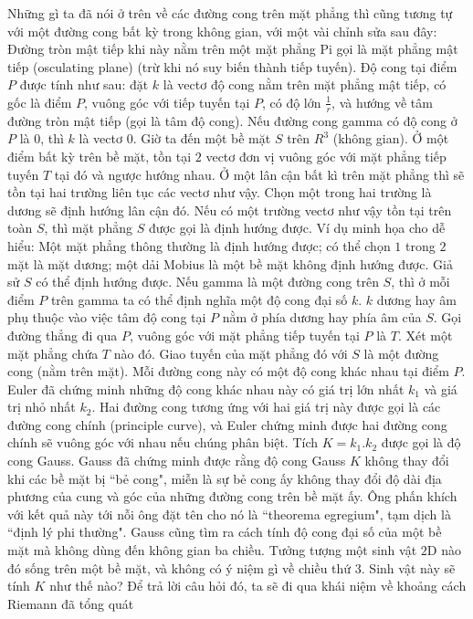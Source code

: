 \begin{multicols}{2}
	\vskip 0.1cm
	Những gì ta đã nói ở trên về các đường cong trên mặt phẳng thì cũng tương tự với một đường cong bất kỳ trong không gian, với một vài chỉnh sửa sau đây:
	\vskip 0.1cm
	Đường tròn mật tiếp khi này nằm trên một mặt phẳng Pi gọi là mặt phẳng mật tiếp (osculating plane) (trừ khi nó suy biến thành tiếp tuyến). Độ cong tại điểm $P$ được tính như sau: đặt $k$ là vectơ độ cong nằm trên mặt phẳng mật tiếp, có gốc là điểm $P$, vuông góc với tiếp tuyến tại $P$, có độ lớn $ \frac{1}{r}$, và hướng về tâm đường tròn mật tiếp (gọi là tâm độ cong). Nếu đường cong gamma có độ cong ở $P$ là $0$, thì $k$ là vectơ $0$. 
	\vskip 0.1cm
	Giờ ta đến một bề mặt $S$ trên $R^3$ (không gian). Ở một điểm bất kỳ trên bề mặt, tồn tại $2$ vectơ đơn vị vuông góc với mặt phẳng tiếp tuyến $T$ tại đó và ngược hướng nhau. Ở một lân cận bất kì trên mặt phẳng thì sẽ tồn tại hai trường liên tục các vectơ như vậy. Chọn một trong hai trường là dương sẽ định hướng lân cận đó. Nếu có một trường vectơ như vậy tồn tại trên toàn $S$, thì mặt phẳng $S$ được gọi là định hướng được. 
	\vskip 0.1cm
	Ví dụ minh họa cho dễ hiểu: Một mặt phẳng thông thường là định hướng được; có thể chọn $1$ trong $2$ mặt là mặt dương; một dải Mobius là một bề mặt không định hướng được.
	\vskip 0.1cm
	Giả sử $S$ có thể định hướng được. Nếu gamma là một đường cong trên $S$, thì ở mỗi điểm $P$ trên gamma ta có thể định nghĩa một độ cong đại số $k$. $k$ dương hay âm phụ thuộc vào việc tâm độ cong tại $P$ nằm ở phía dương hay phía âm của $S$.
	\vskip 0.1cm
	Gọi đường thẳng đi qua $P$, vuông góc với mặt phẳng tiếp tuyến tại $P$ là $T$. Xét một mặt phẳng chứa $T$ nào đó. Giao tuyến của mặt phẳng đó với $S$ là một đường cong (nằm trên mặt). Mỗi đường cong này có một độ cong khác nhau tại điểm $P$. Euler đã chứng minh những độ cong khác nhau này có giá trị lớn nhất $k_1$ và giá trị nhỏ nhất $k_2$. Hai đường cong tương ứng với hai giá trị này được gọi là các đường cong chính (principle curve), và Euler chứng minh được hai đường cong chính sẽ vuông góc với nhau nếu chúng phân biệt. Tích $K = k_1.k_2$ được gọi là độ cong Gauss. 
	\vskip 0.1cm
	Gauss đã chứng minh được rằng độ cong Gauss $K$ không thay đổi khi các bề mặt bị ``bẻ cong", miễn là sự bẻ cong ấy không thay đổi độ dài địa phương của cung và góc của những đường cong trên bề mặt ấy. 
	\vskip 0.1cm
	Ông phấn khích với kết quả này tới nỗi ông đặt tên cho nó là ``theorema egregium", tạm dịch là ``định lý phi thường". Gauss cũng tìm ra cách tính độ cong đại số của một bề mặt mà không dùng đến không gian ba chiều. Tưởng tượng một sinh vật $2$D nào đó sống trên một bề mặt, và không có ý niệm gì về chiều thứ $3$. Sinh vật này sẽ tính $K$ như thế nào? Để trả lời câu hỏi đó, ta sẽ đi qua khái niệm về khoảng cách Riemann đã tổng quát

\end{multicols}
